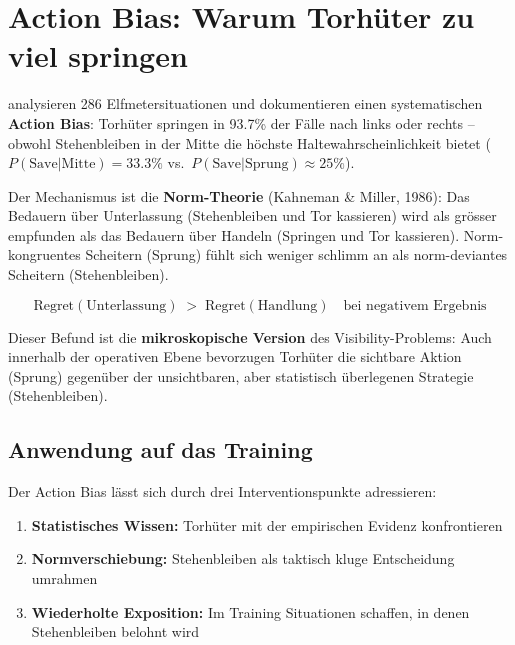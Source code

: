 \documentclass[12pt,a4paper]{article}
\begin{document}
\section{Action Bias: Warum Torh\"uter zu viel springen}
\label{sec:action-bias}

\citet{bareli2007} analysieren 286 Elfmetersituationen und dokumentieren einen systematischen \textbf{Action Bias}: Torh\"uter springen in 93.7\% der F\"alle nach links oder rechts -- obwohl Stehenbleiben in der Mitte die h\"ochste Haltewahrscheinlichkeit bietet ($P(\text{Save}|\text{Mitte}) = 33.3\%$ vs.\ $P(\text{Save}|\text{Sprung}) \approx 25\%$).

Der Mechanismus ist die \textbf{Norm-Theorie} (Kahneman \& Miller, 1986): Das Bedauern \"uber Unterlassung (Stehenbleiben und Tor kassieren) wird als gr\"osser empfunden als das Bedauern \"uber Handeln (Springen und Tor kassieren). Norm-kongruentes Scheitern (Sprung) f\"uhlt sich weniger schlimm an als norm-deviantes Scheitern (Stehenbleiben).

\begin{equation}
\label{eq:action-bias}
\text{Regret}(\text{Unterlassung}) \;>\; \text{Regret}(\text{Handlung}) \quad \text{bei negativem Ergebnis}
\end{equation}

Dieser Befund ist die \textbf{mikroskopische Version} des Visibility-Problems: Auch innerhalb der operativen Ebene bevorzugen Torh\"uter die sichtbare Aktion (Sprung) gegen\"uber der unsichtbaren, aber statistisch \"uberlegenen Strategie (Stehenbleiben).

\subsection{Anwendung auf das Training}

Der Action Bias l\"asst sich durch drei Interventionspunkte adressieren:

\begin{enumerate}[nosep]
  \item \textbf{Statistisches Wissen:} Torh\"uter mit der empirischen Evidenz konfrontieren
  \item \textbf{Normverschiebung:} Stehenbleiben als taktisch kluge Entscheidung umrahmen
  \item \textbf{Wiederholte Exposition:} Im Training Situationen schaffen, in denen Stehenbleiben belohnt wird
\end{enumerate}
\end{document}
